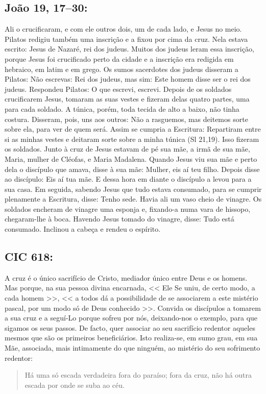 \documentclass[10pt,a5paper]{book}
\newcommand{\from}[1]{\subsection*{#1}}
\begin{document}
\from{João 19, 17--30:}

Ali o crucificaram, e com ele outros dois, um de cada lado, e Jesus no meio.
Pilatos redigiu também uma inscrição e a fixou por cima da cruz.
Nela estava escrito:
Jesus de Nazaré, rei dos judeus.
Muitos dos judeus leram essa inscrição, porque Jesus foi crucificado perto da cidade e a inscrição era redigida em hebraico, em latim e em grego.
Os sumos sacerdotes dos judeus disseram a Pilatos:
Não escrevas:
Rei dos judeus, mas sim:
Este homem disse ser o rei dos judeus.
Respondeu Pilatos:
O que escrevi, escrevi.
Depois de os soldados crucificarem Jesus, tomaram as suas vestes e fizeram delas quatro partes, uma para cada soldado.
A túnica, porém, toda tecida de alto a baixo, não tinha costura.
Disseram, pois, uns aos outros:
Não a rasguemos, mas deitemos sorte sobre ela, para ver de quem será.
Assim se cumpria a Escritura:
Repartiram entre si as minhas vestes e deitaram sorte sobre a minha túnica (Sl 21,19).
Isso fizeram os soldados.
Junto à cruz de Jesus estavam de pé sua mãe, a irmã de sua mãe, Maria, mulher de Cléofas, e Maria Madalena.
Quando Jesus viu sua mãe e perto dela o discípulo que amava, disse à sua mãe:
Mulher, eis aí teu filho.
Depois disse ao discípulo:
Eis aí tua mãe.
E dessa hora em diante o discípulo a levou para a sua casa.
Em seguida, sabendo Jesus que tudo estava consumado, para se cumprir plenamente a Escritura, disse:
Tenho sede.
Havia ali um vaso cheio de vinagre.
Os soldados encheram de vinagre uma esponja e, fixando-a numa vara de hissopo, chegaram-lhe à boca.
Havendo Jesus tomado do vinagre, disse:
Tudo está consumado.
Inclinou a cabeça e rendeu o espírito.

\from{CIC 618:}

A cruz é o único sacrifício de Cristo, mediador único entre Deus e os homens.
Mas porque, na sua pessoa divina encarnada,
<< Ele Se uniu, de certo modo, a cada homem >>, << a todos dá a possibilidade de se associarem a este mistério pascal, por um modo só de Deus conhecido >>.
Convida os discípulos a tomarem a sua cruz e a seguí-Lo porque sofreu por nós, deixando-nos o exemplo, para que sigamos os seus passos.
De facto, quer associar ao seu sacrifício redentor aqueles mesmos que são os primeiros beneficiários.
Isto realiza-se, em sumo grau, em sua Mãe, associada, mais intimamente do que ninguém, ao mistério do seu sofrimento redentor:
\begin{quote}
Há uma só escada verdadeira fora do paraíso;
fora da cruz, não há outra escada por onde se suba ao céu.
\end{quote}
\end{document}

